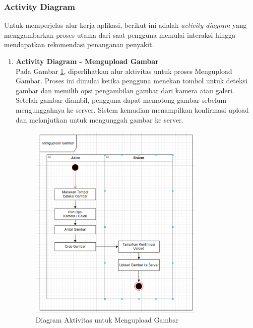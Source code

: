 \documentclass[journal,article,submit,pdftex,moreauthors]{Definitions/mdpi}
\begin{document}
\subsubsection{Activity Diagram}
Untuk memperjelas alur kerja aplikasi, berikut ini adalah \textit{activity diagram} yang menggambarkan proses utama dari saat pengguna memulai interaksi hingga mendapatkan rekomendasi penanganan penyakit.

\begin{enumerate}[label=\alph*)]
    \item \textbf{Activity Diagram - Mengupload Gambar} \\
    Pada Gambar \ref{fig:activity-upload-gambar}, diperlihatkan alur aktivitas untuk proses Mengupload Gambar. Proses ini dimulai ketika pengguna menekan tombol untuk deteksi gambar dan memilih opsi pengambilan gambar dari kamera atau galeri. Setelah gambar diambil, pengguna dapat memotong gambar sebelum mengunggahnya ke server. Sistem kemudian menampilkan konfirmasi upload dan melanjutkan untuk mengunggah gambar ke server.
    
    \begin{figure}[H]
        \centering
        \includegraphics[width=0.8\textwidth]{Images/activity_upload.png}
        \caption{\centering Diagram Aktivitas untuk Mengupload Gambar}
        \label{fig:activity-upload-gambar}
    \end{figure}


\end{enumerate}
\end{document}
